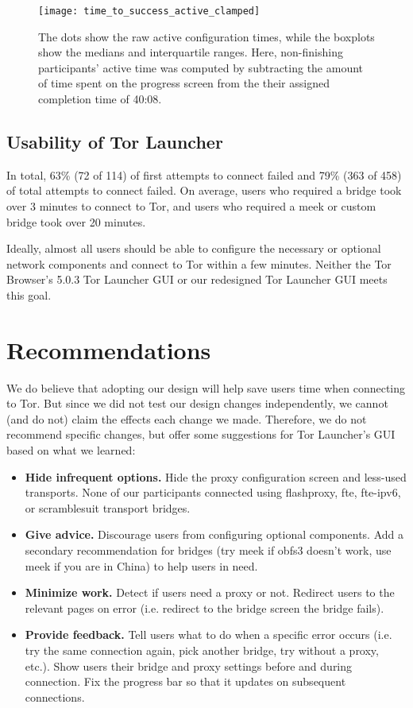 \documentclass[USenglish,oneside,twocolumn]{article}
\begin{document}
\begin{figure}[t]
\centering
\texttt{[image: time\_to\_success\_active\_clamped]}
\caption{
The dots show the raw active configuration times,
while the boxplots show the medians and interquartile ranges.
Here, non-finishing participants' active time was computed by
subtracting the amount of time spent on the progress screen from the 
their assigned completion time of 40:08.
}
\label{fig:time_to_success_active_clamped}
\end{figure}

\subsection{Usability of Tor Launcher} 
In total, 63\% (72 of 114) of first attempts to connect failed and 79\% (363 of 458) of total attempts to connect failed.
On average, users who required a bridge took over 3 minutes to connect to Tor, and users who required a meek or custom bridge took over 20 minutes.

Ideally, almost all users should be able to configure the necessary or optional network components and connect to Tor within a few minutes. Neither the Tor Browser's 5.0.3 Tor Launcher GUI or our redesigned Tor Launcher GUI meets this goal.

\section{Recommendations}
\label{sec:recommendations}
We do believe that adopting our design will help save users time when connecting to Tor. But since we did not test our design changes independently, we cannot (and do not) claim the effects each change we made. Therefore, we do not recommend specific changes, but offer some suggestions for Tor Launcher's GUI based on what we learned: \\

\begin{itemize}
\item {\bfseries Hide infrequent options.} Hide the proxy configuration screen and less-used transports. None of our participants connected using flashproxy, fte, fte-ipv6, or scramblesuit transport bridges. 
\item {\bfseries Give advice.} Discourage users from configuring optional components. Add a secondary recommendation for bridges (try meek if obfs3 doesn't work, use meek if you are in China) to help users in need. 
\item {\bfseries Minimize work.} Detect if users need a proxy or not. Redirect users to the relevant pages on error (i.e. redirect to the bridge screen the bridge fails).  
\item {\bfseries Provide feedback.} Tell users what to do when a specific error occurs (i.e. try the same connection again, pick another bridge, try without a proxy, etc.).  Show users their bridge and proxy settings before and during connection. Fix the progress bar so that it updates on subsequent connections.
\end{itemize}
\end{document}
